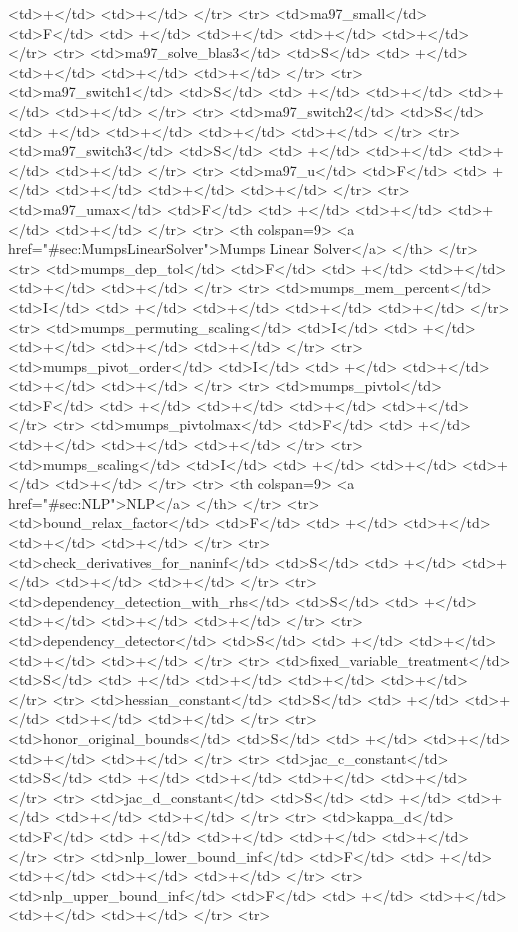 {{<td>+</td>
<td>+</td>
</tr>
<tr>
<td>ma97_small</td>
<td>F</td>
<td> +</td>
<td>+</td>
<td>+</td>
<td>+</td>
</tr>
<tr>
<td>ma97_solve_blas3</td>
<td>S</td>
<td> +</td>
<td>+</td>
<td>+</td>
<td>+</td>
</tr>
<tr>
<td>ma97_switch1</td>
<td>S</td>
<td> +</td>
<td>+</td>
<td>+</td>
<td>+</td>
</tr>
<tr>
<td>ma97_switch2</td>
<td>S</td>
<td> +</td>
<td>+</td>
<td>+</td>
<td>+</td>
</tr>
<tr>
<td>ma97_switch3</td>
<td>S</td>
<td> +</td>
<td>+</td>
<td>+</td>
<td>+</td>
</tr>
<tr>
<td>ma97_u</td>
<td>F</td>
<td> +</td>
<td>+</td>
<td>+</td>
<td>+</td>
</tr>
<tr>
<td>ma97_umax</td>
<td>F</td>
<td> +</td>
<td>+</td>
<td>+</td>
<td>+</td>
</tr>
<tr>   <th colspan=9> <a href="#sec:MumpsLinearSolver">Mumps Linear Solver</a> </th>
</tr>
<tr>
<td>mumps_dep_tol</td>
<td>F</td>
<td> +</td>
<td>+</td>
<td>+</td>
<td>+</td>
</tr>
<tr>
<td>mumps_mem_percent</td>
<td>I</td>
<td> +</td>
<td>+</td>
<td>+</td>
<td>+</td>
</tr>
<tr>
<td>mumps_permuting_scaling</td>
<td>I</td>
<td> +</td>
<td>+</td>
<td>+</td>
<td>+</td>
</tr>
<tr>
<td>mumps_pivot_order</td>
<td>I</td>
<td> +</td>
<td>+</td>
<td>+</td>
<td>+</td>
</tr>
<tr>
<td>mumps_pivtol</td>
<td>F</td>
<td> +</td>
<td>+</td>
<td>+</td>
<td>+</td>
</tr>
<tr>
<td>mumps_pivtolmax</td>
<td>F</td>
<td> +</td>
<td>+</td>
<td>+</td>
<td>+</td>
</tr>
<tr>
<td>mumps_scaling</td>
<td>I</td>
<td> +</td>
<td>+</td>
<td>+</td>
<td>+</td>
</tr>
<tr>   <th colspan=9> <a href="#sec:NLP">NLP</a> </th>
</tr>
<tr>
<td>bound_relax_factor</td>
<td>F</td>
<td> +</td>
<td>+</td>
<td>+</td>
<td>+</td>
</tr>
<tr>
<td>check_derivatives_for_naninf</td>
<td>S</td>
<td> +</td>
<td>+</td>
<td>+</td>
<td>+</td>
</tr>
<tr>
<td>dependency_detection_with_rhs</td>
<td>S</td>
<td> +</td>
<td>+</td>
<td>+</td>
<td>+</td>
</tr>
<tr>
<td>dependency_detector</td>
<td>S</td>
<td> +</td>
<td>+</td>
<td>+</td>
<td>+</td>
</tr>
<tr>
<td>fixed_variable_treatment</td>
<td>S</td>
<td> +</td>
<td>+</td>
<td>+</td>
<td>+</td>
</tr>
<tr>
<td>hessian_constant</td>
<td>S</td>
<td> +</td>
<td>+</td>
<td>+</td>
<td>+</td>
</tr>
<tr>
<td>honor_original_bounds</td>
<td>S</td>
<td> +</td>
<td>+</td>
<td>+</td>
<td>+</td>
</tr>
<tr>
<td>jac_c_constant</td>
<td>S</td>
<td> +</td>
<td>+</td>
<td>+</td>
<td>+</td>
</tr>
<tr>
<td>jac_d_constant</td>
<td>S</td>
<td> +</td>
<td>+</td>
<td>+</td>
<td>+</td>
</tr>
<tr>
<td>kappa_d</td>
<td>F</td>
<td> +</td>
<td>+</td>
<td>+</td>
<td>+</td>
</tr>
<tr>
<td>nlp_lower_bound_inf</td>
<td>F</td>
<td> +</td>
<td>+</td>
<td>+</td>
<td>+</td>
</tr>
<tr>
<td>nlp_upper_bound_inf</td>
<td>F</td>
<td> +</td>
<td>+</td>
<td>+</td>
<td>+</td>
</tr>
<tr>
}}
